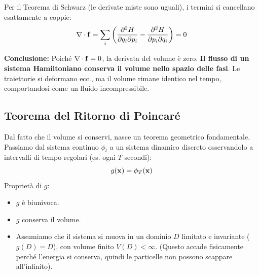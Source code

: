 \documentclass[openany]{book}
\theoremstyle{definition}
\theoremstyle{remark}
\begin{document}
\begin{figure}
\vspace{-20pt}
\begin{center}
\end{center}
\vspace{-20pt}
\end{figure}

Per il Teorema di Schwarz (le derivate miste sono uguali), i termini si cancellano esattamente a coppie:
\begin{equation*}
    \nabla \cdot \vb{f} = \sum_i \left( \frac{\partial^2 H}{\partial q_i \partial p_i} - \frac{\partial^2 H}{\partial p_i \partial q_i} \right) = 0
\end{equation*}

\textbf{Conclusione:} Poiché $\nabla \cdot \vb{f} = 0$, la derivata del volume è zero. \textbf{Il flusso di un sistema Hamiltoniano conserva il volume nello spazio delle fasi}. Le traiettorie si deformano ecc., ma il volume rimane identico nel tempo, comportandosi come un fluido incompressibile.


\subsection*{Teorema del Ritorno di Poincaré}

Dal fatto che il volume si conservi, nasce un teorema geometrico fondamentale.
Passiamo dal sistema continuo $\phi_t$ a un sistema dinamico discreto osservandolo a intervalli di tempo regolari (es. ogni $T$ secondi):
\begin{equation*}
    g(\vb{x}) = \phi_T(\vb{x})
\end{equation*}
Proprietà di $g$:
\begin{itemize}
    \item $g$ è biunivoca.
    \item $g$ conserva il volume.
    \item Assumiamo che il sistema si muova in un dominio $D$ limitato e invariante ($g(D)=D$), con volume finito $V(D) < \infty$. (Questo accade fisicamente perché l'energia si conserva, quindi le particelle non possono scappare all'infinito).
\end{itemize}
\end{document}
